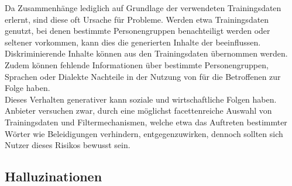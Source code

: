 \documentclass[../main.tex]{subfiles}
\begin{document}
Da  Zusammenhänge lediglich auf Grundlage der verwendeten Trainingsdaten erlernt, sind diese oft Ursache für Probleme. Werden etwa Trainingsdaten genutzt, 
bei denen bestimmte Personengruppen benachteiligt werden oder seltener vorkommen, kann dies die generierten Inhalte der  beeinflussen. Diskriminierende Inhalte können aus den Trainingsdaten 
übernommen werden. Zudem können fehlende Informationen über bestimmte Personengruppen, Sprachen oder Dialekte Nachteile in der Nutzung von  für die Betroffenen zur Folge haben.\\ 
Dieses Verhalten generativer  kann soziale und wirtschaftliche Folgen haben.  Anbieter versuchen zwar, durch eine möglichst 
facettenreiche Auswahl von Trainingsdaten und Filtermechanismen, welche etwa das Auftreten bestimmter Wörter wie Beleidigungen verhindern, entgegenzuwirken, 
dennoch sollten sich Nutzer dieses Risikos bewusst sein.\\

\subsection{Halluzinationen}
\end{document}
